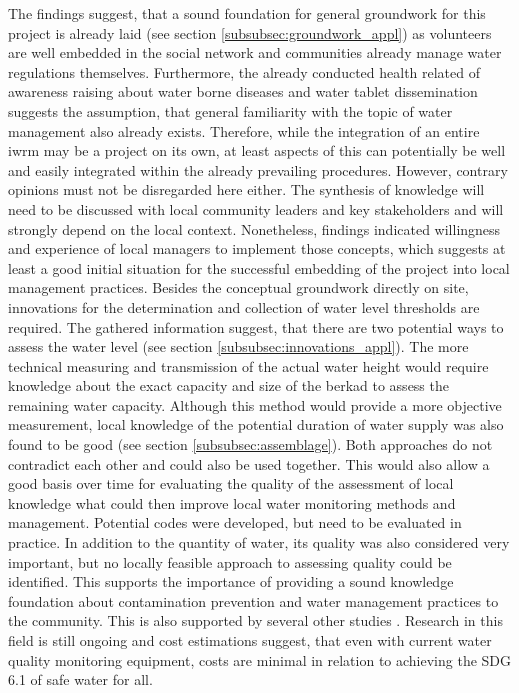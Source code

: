 The findings suggest, that a sound foundation for general groundwork for this project is already laid (see section \ref{subsubsec:groundwork_appl}) as volunteers are well embedded in the social network and communities already manage water regulations themselves. Furthermore, the already conducted health related  of awareness raising about water borne diseases and water tablet dissemination suggests the assumption, that general familiarity with the topic of water management also already exists. Therefore, while the integration of an entire \acrshort{iwrm} may be a project on its own, at least aspects of this can potentially be well and easily integrated within the already prevailing procedures. However, contrary opinions must not be disregarded here either. The synthesis of knowledge will need to be discussed with local community leaders and key stakeholders and will strongly depend on the local context. Nonetheless, findings indicated willingness and experience of local managers to implement those concepts, which suggests at least a good initial situation for the successful embedding of the project into local management practices.
Besides the conceptual groundwork directly on site, innovations for the determination and collection of water level thresholds are required. The gathered information suggest, that there are two potential ways to assess the water level (see section \ref{subsubsec:innovations_appl}). The more technical measuring and transmission of the actual water height would require knowledge about the exact capacity and size of the berkad to assess the remaining water capacity. Although this method would provide a more objective measurement, local knowledge of the potential duration of water supply was also found to be good (see section \ref{subsubsec:assemblage}). Both approaches do not contradict each other and could also be used together. This would also allow a good basis over time for evaluating the quality of the assessment of local knowledge what could then improve local water monitoring methods and management. Potential codes were developed, but need to be evaluated in practice. In addition to the quantity of water, its quality was also considered very important, but no locally feasible approach to assessing quality could be identified. This supports the importance of providing a sound knowledge foundation about contamination prevention and water management practices to the community. This is also supported by several other studies \autocite{danielAssessingDrinkingWater2020,huangManagementDrinkingWater2020,tariqOpenSourceWater2021,wmoPlanningWaterqualityMonitoring2013}. Research in this field is still ongoing \autocite{tariqOpenSourceWater2021} and \autocite{delaireHowMuchWill2017} cost estimations suggest, that even with current water quality monitoring equipment, costs are minimal in relation to achieving the SDG 6.1 of safe water for all.\newline 
